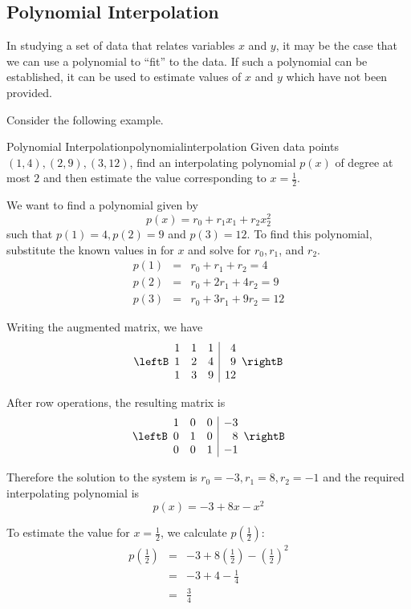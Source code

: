 \subsection{Polynomial Interpolation}

In studying a set of data that relates variables $x$ and $y$, it may be the case that we can use a polynomial to ``fit'' to the data. If such a polynomial can be established, it can be used to estimate values of $x$ and $y$ which have not been provided. 

Consider the following example.

\begin{example}{Polynomial Interpolation}{polynomialinterpolation}
Given data points $(1,4), (2,9), (3,12)$, find an interpolating polynomial $p(x)$ of degree at most $2$ and then estimate the value corresponding to $x = \frac{1}{2}$. 
\end{example}

\begin{solution}
We want to find a polynomial given by 
\[
p(x) = r_0 + r_1x_1 + r_2x_2^2
\]
such that $p(1)=4, p(2)=9$ and $p(3)=12$. 
To find this polynomial, substitute the known values in for $x$ and solve for $r_0, r_1$, and $r_2$. 
\begin{eqnarray*}
p(1) &=& r_0 + r_1 + r_2 = 4\\
p(2) &=& r_0 + 2r_1 + 4r_2 = 9\\
p(3) &=& r_0 + 3r_1 + 9r_2 = 12
\end{eqnarray*}

Writing the augmented matrix, we have
\[
\leftB
\begin{array}{rrr|r}
1 & 1 & 1 & 4 \\
1 & 2 & 4 & 9  \\
1 & 3 & 9 & 12 
\end{array}
\rightB
\]

After row operations, the resulting matrix is
\[
\leftB
\begin{array}{rrr|r}
1 & 0 & 0 & -3 \\
0 & 1 & 0 & 8 \\
0 & 0 & 1 & -1 
\end{array}
\rightB
\]

Therefore the solution to the system is $r_0 = -3, r_1 = 8, r_2 = -1$ and the required interpolating polynomial is 
\[
p(x) = -3 + 8x - x^2
\]

To estimate the value for $x = \frac{1}{2}$, we calculate $p(\frac{1}{2})$: 
\begin{eqnarray*}
p(\frac{1}{2}) &=& -3 + 8(\frac{1}{2}) - (\frac{1}{2})^2\\
&=& -3 + 4 - \frac{1}{4} \\
&=& \frac{3}{4}
\end{eqnarray*}
\end{solution}

